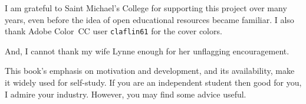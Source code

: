 {I am grateful to Saint Michael's College 
for supporting this project over many years, even before the idea of 
open educational resources became familiar.
I also thank Adobe Color~CC user \texttt{claflin61} for the cover colors.

And, I cannot thank my wife Lynne enough for her unflagging encouragement.



\newcommand{\classday}[1]{\textsc{#1}}
\newcommand{\colwidth}{1.25in}

\medskip
%
This book's emphasis on motivation and development,
and its availability, make it widely used for self-study.
If you are an independent student then good for you, I admire your industry.
However, you may find some advice useful.

}
